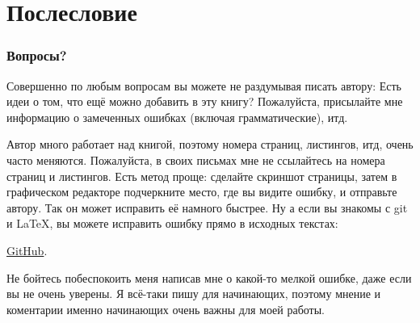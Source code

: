 \part*{Послесловие}

\section{Вопросы?}

Совершенно по любым вопросам вы можете не раздумывая писать автору: \GTT{<\EMAIL>}
Есть идеи о том, что ещё можно добавить в эту книгу?
Пожалуйста, присылайте мне информацию о замеченных ошибках (включая грамматические), итд.

Автор много работает над книгой, поэтому номера страниц, листингов, итд, очень часто меняются.
Пожалуйста, в своих письмах мне не ссылайтесь на номера страниц и листингов.
Есть метод проще: сделайте скриншот страницы, затем в графическом редакторе подчеркните место, где вы видите
ошибку, и отправьте автору. Так он может исправить её намного быстрее.
Ну а если вы знакомы с git и \LaTeX, вы можете исправить ошибку прямо в исходных текстах:

\href{http://go.yurichev.com/17089}{GitHub}.

Не бойтесь побеспокоить меня написав мне о какой-то мелкой ошибке, даже если вы не очень уверены.
Я всё-таки пишу для начинающих, поэтому мнение и коментарии именно начинающих очень важны для моей работы.

